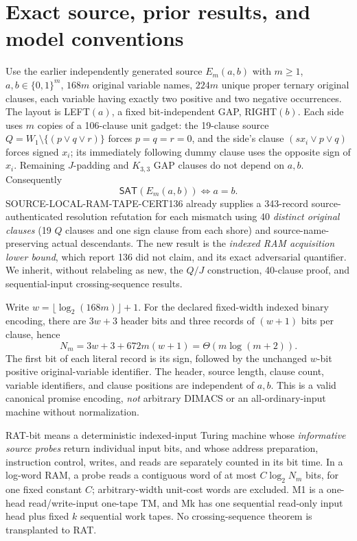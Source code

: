 \documentclass[11pt]{article}
\newcommand{\SAT}{\mathsf{SAT}}
\begin{document}
\section{Exact source, prior results, and model conventions}
Use the earlier independently generated source
$E_m(a,b)$ with $m\ge1$, $a,b\in\{0,1\}^m$, $168m$
original variable names, $224m$ unique proper ternary original clauses,
each variable having exactly two positive and two negative occurrences.
The layout is LEFT$(a)$, a fixed bit-independent GAP, RIGHT$(b)$.
Each side uses $m$ copies of a 106-clause unit gadget:
the 19-clause source $Q=W_1\setminus\{(p\vee q\vee r)\}$
forces $p=q=r=0$, and the side's clause $(s x_i\vee p\vee q)$
forces signed $x_i$; its immediately following dummy clause uses the
opposite sign of $x_i$. Remaining $J$-padding and $K_{3,3}$ GAP clauses
do not depend on $a,b$. Consequently
\begin{equation}
\SAT(E_m(a,b))\Longleftrightarrow a=b. \tag{1}
\end{equation}
SOURCE-LOCAL-RAM-TAPE-CERT136 already supplies a 343-record
source-authenticated resolution refutation for each mismatch using
40 \emph{distinct original clauses} (19 $Q$ clauses and one sign clause
from each shore) and source-name-preserving actual descendants.
The new result is the \emph{indexed RAM acquisition lower bound},
which report 136 did not claim, and its exact adversarial quantifier.
We inherit, without relabeling as new, the $Q/J$ construction,
40-clause proof, and sequential-input crossing-sequence results.

Write $w=\lfloor\log_2(168m)\rfloor+1$.
For the declared fixed-width indexed binary encoding, there are
$3w+3$ header bits and three records of $(w+1)$ bits per clause, hence
\begin{equation}
N_m=3w+3+672m(w+1)=\Theta(m\log(m+2)). \tag{2}
\end{equation}
The first bit of each literal record is its sign, followed by the
unchanged $w$-bit positive original-variable identifier.
The header, source length, clause count, variable identifiers,
and clause positions are independent of $a,b$.
This is a valid canonical promise encoding, \emph{not} arbitrary DIMACS
or an all-ordinary-input machine without normalization.

RAT-bit means a deterministic indexed-input Turing machine whose
\emph{informative source probes} return individual input bits,
and whose address preparation, instruction control, writes, and reads
are separately counted in its bit time. In a log-word RAM,
a probe reads a contiguous word of at most $C\log_2 N_m$ bits,
for one fixed constant $C$; arbitrary-width unit-cost words are excluded.
M1 is a one-head read/write-input one-tape TM, and Mk has one sequential
read-only input head plus fixed $k$ sequential work tapes.
No crossing-sequence theorem is transplanted to RAT.
\end{document}
